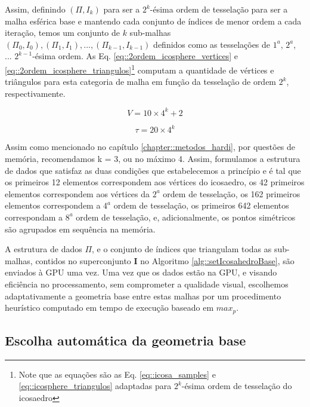 Assim, definindo $(\Pi, I_k)$ para ser a $2^{k}$-ésima ordem de tesselação para ser a malha esférica base e mantendo cada conjunto de índices de menor ordem a cada iteração, temos um conjunto de $k$ sub-malhas $(\Pi_0, I_0), (\Pi_1, I_1), ..., (\Pi_{k-1}, I_{k-1})$ definidos como as tesselações de $1^{a}$, $2^{a}$, ... $2^{k-1}$-ésima ordem. As Eq. \ref{eq::2ordem_icosphere_vertices} e \ref{eq::2ordem_icosphere_triangulos}\footnote{Note que as equações são as Eq. \ref{eq::icosa_samples} e \ref{eq::icosphere_triangulos} adaptadas para $2^k$-ésima ordem de tesselação do icosaedro} computam a quantidade de vértices e triângulos para esta categoria de malha em função da tesselação de ordem $2^k$, respectivamente.

\begin{equation}
\label{eq::2ordem_icosphere_vertices}
V = 10\times 4^k + 2
\end{equation}

\begin{equation}
\label{eq::2ordem_icosphere_triangulos}
\tau = 20\times 4^k
\end{equation}

Assim como mencionado no capítulo \ref{chapter::metodos_hardi}, por questões de memória, recomendamos k = 3, ou no máximo 4. Assim, formulamos a estrutura de dados que satisfaz as duas condições que estabelecemos a princípio e é tal que os primeiros 12 elementos correspondem aos vértices do icosaedro, os 42 primeiros elementos correspondem aos vértices da $2^a$ ordem de tesselação, os 162 primeiros elementos correspondem a $4^a$ ordem de tesselação, os primeiros 642 elementos correspondam a $8^{a}$ ordem de tesselação, e, adicionalmente, os pontos simétricos são agrupados em sequência na memória.

A estrutura de dados $\Pi$, e o conjunto de índices que triangulam todas as sub-malhas, contidos no superconjunto $\mathbf{I}$ no Algoritmo \ref{alg::setIcosahedroBase}, são enviados à GPU uma vez. Uma vez que os dados estão na GPU, e visando eficiência no processamento, sem comprometer a qualidade visual, escolhemos adaptativamente a geometria base entre estas malhas por um procedimento heurístico computado em tempo de execução baseado em $max_p$.

\subsection{Escolha automática da geometria base}
\label{sssec::escolha_automatica_da_geometria_base}

